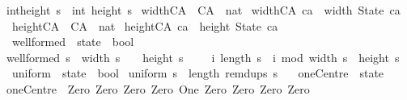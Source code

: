 \begin{isabellebody}
{\isachardoublequoteopen}int{\isacharunderscore}height\ s\ {\isasymequiv}\ int\ {\isacharparenleft}height\ s{\isacharparenright}{\isachardoublequoteclose}\isanewline
\isanewline
{}\isamarkupfalse%
\ widthCA\ {\isacharcolon}{\isacharcolon}\ {\isachardoublequoteopen}CA\ {\isasymRightarrow}\ nat{\isachardoublequoteclose}\ \isanewline
{\isachardoublequoteopen}widthCA\ ca\ {\isacharequal}\ width\ {\isacharparenleft}State\ ca{\isacharparenright}{\isachardoublequoteclose}\isanewline
\isanewline
{}\isamarkupfalse%
\ heightCA\ {\isacharcolon}{\isacharcolon}\ {\isachardoublequoteopen}CA\ {\isasymRightarrow}\ nat{\isachardoublequoteclose}\ \isanewline
{\isachardoublequoteopen}heightCA\ ca\ {\isacharequal}\ height\ {\isacharparenleft}State\ ca{\isacharparenright}{\isachardoublequoteclose}\isanewline
\isanewline
{}\isamarkupfalse%
\ wellformed\ {\isacharcolon}{\isacharcolon}\ {\isachardoublequoteopen}state\ {\isasymRightarrow}\ bool{\isachardoublequoteclose}\ \isanewline
{\isachardoublequoteopen}wellformed\ s\ {\isasymequiv}\ {\isacharparenleft}width\ s\ {\isasymge}\ {}{\isacharparenright}\ {\isasymand}\ {\isacharparenleft}height\ s\ {\isasymge}\ {}{\isacharparenright}\ {\isasymand}\ {\isacharparenleft}{\isasymforall}\ i{\isachardot}\ length\ {\isacharparenleft}s\ {\isacharbang}\ {\isacharparenleft}i\ mod\ {\isacharparenleft}width\ s{\isacharparenright}{\isacharparenright}{\isacharparenright}\ {\isacharequal}\ height\ s{\isacharparenright}{\isachardoublequoteclose}\isanewline
\isanewline
\isanewline
{}\isamarkupfalse%
\ uniform\ {\isacharcolon}{\isacharcolon}\ {\isachardoublequoteopen}state\ {\isasymRightarrow}\ bool{\isachardoublequoteclose}\ \isanewline
{\isachardoublequoteopen}uniform\ s\ {\isasymequiv}\ length\ {\isacharparenleft}remdups\ s{\isacharparenright}\ {\isacharequal}\ {}{\isachardoublequoteclose}\isanewline
\isanewline
{}\isamarkupfalse%
\ oneCentre\ {\isacharcolon}{\isacharcolon}\ state\ \isanewline
{\isachardoublequoteopen}oneCentre\ {\isasymequiv}\ {\isacharbrackleft}{\isacharbrackleft}Zero{\isacharcomma}\ Zero{\isacharcomma}\ Zero{\isacharbrackright}{\isacharcomma}\ {\isacharbrackleft}Zero{\isacharcomma}\ One{\isacharcomma}\ Zero{\isacharbrackright}{\isacharcomma}\ {\isacharbrackleft}Zero{\isacharcomma}\ Zero{\isacharcomma}\ Zero{\isacharbrackright}{\isacharbrackright}{\isachardoublequoteclose}\isanewline
\isanewline
{}\isamarkupfalse%

\end{isabellebody}
